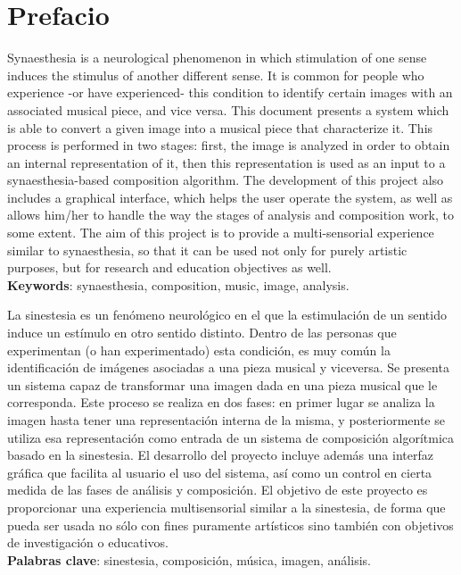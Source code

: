 \chapter*{Prefacio}

\small

Synaesthesia is a neurological phenomenon in which stimulation of one sense induces the stimulus of another different sense. It is common for people who experience -or have experienced- this condition to identify certain images with an associated musical piece, and vice versa. This document presents a system which is able to convert a given image into a musical piece that characterize it. This process is performed in two stages: first, the image is analyzed in order to obtain an internal representation of it, then this representation is used as an input to a synaesthesia-based composition algorithm. The development of this project also includes a graphical interface, which helps the user operate the system, as well as allows him/her to handle the way the stages of analysis and composition work, to some extent. The aim of this project is to provide a multi-sensorial experience similar to synaesthesia, so that it can be used not only for purely artistic purposes, but for research and education objectives as well.\\

\noindent\textbf{Keywords}: synaesthesia, composition, music, image, analysis.\\

\vspace{0.3in}



La sinestesia es un fenómeno neurológico en el que la estimulación de un sentido induce un estímulo en otro sentido distinto. Dentro de las personas que experimentan (o han experimentado) esta condición, es muy común la identificación de imágenes asociadas a una pieza musical y viceversa. Se presenta un sistema capaz de transformar una imagen dada en una pieza musical que le corresponda. Este proceso se realiza en dos fases: en primer lugar se analiza la imagen hasta tener una representación interna de la misma, y posteriormente se utiliza esa representación como entrada de un sistema de composición algorítmica basado en la sinestesia. El desarrollo del proyecto incluye además una interfaz gráfica que facilita al usuario el uso del sistema, así como un control en cierta medida de las fases de análisis y composición. El objetivo de este proyecto es proporcionar una experiencia multisensorial similar a la sinestesia, de forma que pueda ser usada no sólo con fines puramente artísticos sino también con objetivos de investigación o educativos.\\


\noindent\textbf{Palabras clave}: sinestesia, composición, música, imagen, análisis.\\


\normalsize